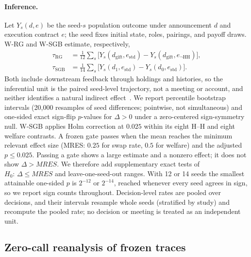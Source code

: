 \documentclass[sigconf,anonymous]{aamas}
\newcommand{\mres}{MRES\xspace}
\begin{document}
\paragraph{Inference.}  Let $Y_s(d,e)$ be the seed-$s$ population outcome under
announcement $d$ and execution contract $e$; the seed fixes initial state,
roles, pairings, and payoff draws.  W-RG and W-SGB estimate, respectively,
\begin{align*}
\tau_{\mathrm{RG}}&=\tfrac{1}{12}\textstyle\sum_s\bigl[Y_s(d_{\mathrm{gift}},e_{\mathrm{std}})-Y_s(d_{\mathrm{gift}},e_{\neg\mathrm{HH}})\bigr],\\
\tau_{\mathrm{SGB}}&=\tfrac{1}{14}\textstyle\sum_s\bigl[Y_s(d_1,e_{\mathrm{std}})-Y_s(d_0,e_{\mathrm{std}})\bigr].
\end{align*}
Both include downstream feedback through holdings and histories, so the
inferential unit is the paired seed-level trajectory, not a meeting or account,
and neither identifies a natural indirect effect~\cite{hudgens2008,aronow2017}.
We report percentile bootstrap intervals (20,000 resamples of seed differences;
pointwise, not simultaneous) and one-sided exact sign-flip $p$-values for
$\Delta>0$ under a zero-centered sign-symmetry null.  W-SGB applies Holm
correction at $0.025$ within its eight H--H and eight welfare contrasts.  A
frozen gate passes when the mean reaches the minimum relevant effect size
(\mres: $0.25$ for swap rate, $0.5$ for welfare) and the adjusted $p\le0.025$.
Passing a gate shows a large estimate and a nonzero effect; it does not show
$\Delta>\mres$.  We therefore add supplementary exact tests of
$H_0{:}\,\Delta\le\mres$ and leave-one-seed-out ranges.  With 12 or 14 seeds the
smallest attainable one-sided $p$ is $2^{-12}$ or $2^{-14}$, reached whenever
every seed agrees in sign, so we report sign counts throughout.  Decision-level
rates are pooled over decisions, and their intervals resample whole seeds
(stratified by study) and recompute the pooled rate; no decision or meeting is
treated as an independent unit.

\subsection{Zero-call reanalysis of frozen traces}
\label{sec:audit}
\end{document}
